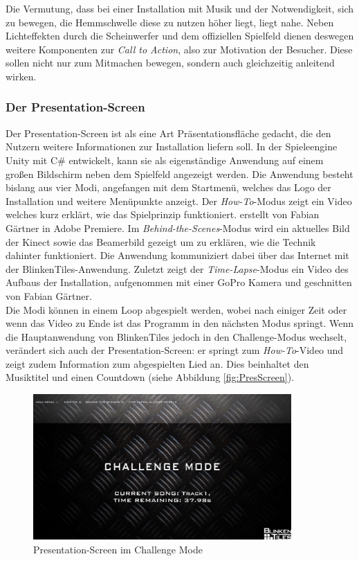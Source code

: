 
Die Vermutung, dass bei einer Installation mit Musik und der Notwendigkeit, sich zu bewegen, die Hemmschwelle diese zu nutzen höher liegt, liegt nahe. Neben Lichteffekten durch die Scheinwerfer und dem offiziellen Spielfeld dienen deswegen weitere Komponenten zur \textit{Call to Action}, also zur Motivation der Besucher. Diese sollen nicht nur zum Mitmachen bewegen, sondern auch gleichzeitig anleitend wirken.

\subsubsection{Der Presentation-Screen}

Der Presentation-Screen ist als eine Art Präsentationsfläche gedacht, die den Nutzern weitere Informationen zur Installation liefern soll. In der Spieleengine Unity mit C\# entwickelt, kann sie als eigenständige Anwendung auf einem großen Bildschirm neben dem Spielfeld angezeigt werden. Die Anwendung besteht bislang aus vier Modi, angefangen mit dem Startmenü, welches das Logo der Installation und weitere Menüpunkte anzeigt. Der \textit{How-To}-Modus zeigt ein Video welches kurz erklärt, wie das Spielprinzip funktioniert.  erstellt von Fabian Gärtner in Adobe Premiere. Im \textit{Behind-the-Scenes}-Modus wird ein aktuelles Bild der Kinect sowie das Beamerbild gezeigt um zu erklären, wie die Technik dahinter funktioniert. Die Anwendung kommuniziert dabei über das Internet mit der BlinkenTiles-Anwendung. Zuletzt zeigt der \textit{Time-Lapse}-Modus ein Video des Aufbaus der Installation, aufgenommen mit einer GoPro Kamera und geschnitten von Fabian Gärtner.\\
Die Modi können in einem Loop abgespielt werden, wobei nach einiger Zeit oder wenn das Video zu Ende ist das Programm in den nächsten Modus springt. Wenn die Hauptanwendung von BlinkenTiles jedoch in den Challenge-Modus wechselt, verändert sich auch der Presentation-Screen: er springt zum \textit{How-To}-Video und zeigt zudem Information zum abgespielten Lied an. Dies beinhaltet den Musiktitel und einen Countdown (siehe Abbildung \autoref{fig:PresScreen}).

\begin{figure}[htbp]
	\centering
		\includegraphics[width=0.88\textwidth]{images/PresScreen.png}
	\caption{Presentation-Screen im Challenge Mode}
	\label{fig:PresScreen}
\end{figure}

